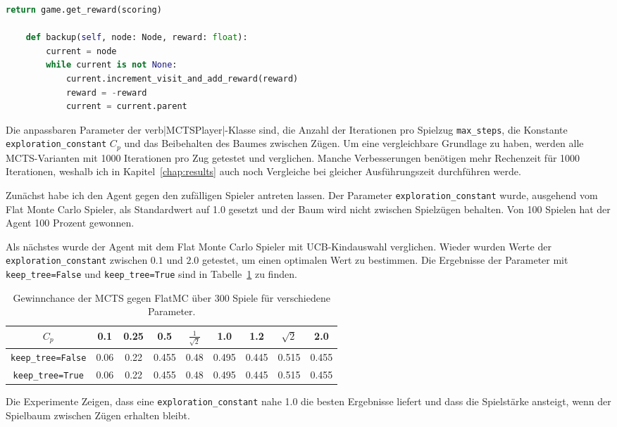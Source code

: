 \begin{lstlisting}[language=Python,caption=Die MCTSPlayer Klasse,label={lst:mcts-player}]
        return game.get_reward(scoring)

    def backup(self, node: Node, reward: float):
        current = node
        while current is not None:
            current.increment_visit_and_add_reward(reward)
            reward = -reward
            current = current.parent

\end{lstlisting}

Die anpassbaren Parameter der verb|MCTSPlayer|-Klasse sind, die Anzahl der Iterationen pro Spielzug \verb|max_steps|, die Konstante \verb|exploration_constant| $C_p$ und das Beibehalten des Baumes zwischen Zügen.
Um eine vergleichbare Grundlage zu haben, werden alle MCTS-Varianten mit 1000 Iterationen pro Zug getestet und verglichen.
Manche Verbesserungen benötigen mehr Rechenzeit für 1000 Iterationen, weshalb ich in Kapitel~\ref{chap:results} auch noch Vergleiche bei gleicher Ausführungszeit durchführen werde.

Zunächst habe ich den Agent gegen den zufälligen Spieler antreten lassen.
Der Parameter \verb|exploration_constant| wurde, ausgehend vom Flat Monte Carlo Spieler, als Standardwert auf 1.0 gesetzt und der Baum wird nicht zwischen Spielzügen behalten.
Von 100 Spielen hat der Agent 100 Prozent gewonnen.

Als nächstes wurde der Agent mit dem Flat Monte Carlo Spieler mit UCB-Kindauswahl verglichen.
Wieder wurden Werte der \verb|exploration_constant| zwischen $0.1$ und $2.0$ getestet, um einen optimalen Wert zu bestimmen.
Die Ergebnisse der Parameter mit \verb|keep_tree=False| und \verb|keep_tree=True| sind in Tabelle~\ref{tab:mcts-flat-mc} zu finden.

\begin{table}[h!]
\centering
\begin{tabular}{ |c||c|c|c|c|c|c|c|c| }
 \hline
 $C_p$ & 0.1 & 0.25 & 0.5 & $\frac{1}{\sqrt{2}}$ & 1.0 & 1.2 & $\sqrt{2}$ & 2.0 \\
 \hline
 \verb|keep_tree=False| & 0.06 & 0.22 & 0.455 & 0.48 & 0.495 & 0.445 & 0.515 & 0.455 \\
 \hline
 \verb|keep_tree=True| & 0.06 & 0.22 & 0.455 & 0.48 & 0.495 & 0.445 & 0.515 & 0.455 \\
 \hline
\end{tabular}
\caption{Gewinnchance der MCTS gegen FlatMC über 300 Spiele für verschiedene Parameter.}
\label{tab:mcts-flat-mc}
\end{table}

Die Experimente Zeigen, dass eine \verb|exploration_constant| nahe 1.0 die besten Ergebnisse liefert und dass die Spielstärke ansteigt, wenn der Spielbaum zwischen Zügen erhalten bleibt.

